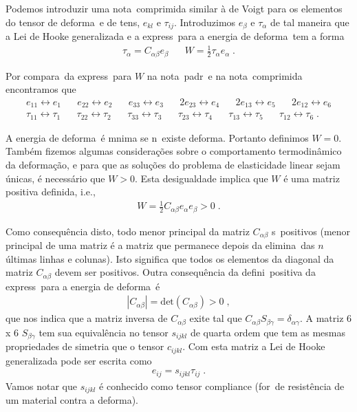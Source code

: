 Podemos introduzir uma nota\cao\ comprimida similar \`a de Voigt para
os elementos do tensor de deforma\cao\ e de tens\ao, 
$e_{kl}$ e $\tau_{ij}$. Introduzimos $e_{\beta}$ e
$\tau_{\alpha}$ de tal maneira que a Lei de Hooke
generalizada e a express\ao\ para a energia de deforma\cao\
tem a forma
\begin{eqnarray}
\tau_{\alpha} = C_{\alpha \beta} e_{\beta} \;\;\;\;\;\;
W = \frac{1}{2}\tau_{\alpha}e_{\alpha} \; .
\end{eqnarray}

Por compara\cao\ da express\ao\ para $W$ na nota\cao\
padr\ao\ e na nota\cao\ comprimida encontramos que
\begin{eqnarray*}
e_{11} \leftrightarrow e_{1} \;\;\;\;\;\;
e_{22} \leftrightarrow e_{2} \;\;\;\;\;\;
e_{33} \leftrightarrow e_{3} \;\;\;\;\;\;
2e_{23} \leftrightarrow e_{4} \;\;\;\;\;\;
2e_{13} \leftrightarrow e_{5} \;\;\;\;\;\;
2e_{12} \leftrightarrow e_{6} \\
\tau_{11} \leftrightarrow \tau_{1} \;\;\;\;\;\;
\tau_{22} \leftrightarrow \tau_{2} \;\;\;\;\;\;
\tau_{33} \leftrightarrow \tau_{3} \;\;\;\;\;\;
\tau_{23} \leftrightarrow \tau_{4} \;\;\;\;\;\;
\tau_{13} \leftrightarrow \tau_{5} \;\;\;\;\;\;
\tau_{12} \leftrightarrow \tau_{6} \; .
\end{eqnarray*}

A energia de deforma\cao\ \'e m\ih nima se n\ao\ existe
deforma\cao. Portanto definimos $W=0$. Tamb\'em fizemos algumas
considera\c{c}\~oes sobre o comportamento termodin\^amico  da deforma\c{c}\~ao,
 e para que as solu\c{c}\~oes do problema de elasticidade
linear sejam \'unicas, \'e necess\'ario que $W>0$. Esta desigualdade
implica que $W$ \'e uma matriz positiva definida, i.e.,
\begin{eqnarray}
W = \frac{1}{2}C_{\alpha \beta}e_{\alpha}e_{\beta}>0 \; .
\end{eqnarray}

Como consequ\^encia disto, todo menor principal da matriz $C_{\alpha
\beta}$ s\ao\ positivos (menor principal de uma matriz \'e a matriz que
permanece depois da elimina\cao\ das $n$ \'ultimas linhas e colunas).
Isto significa que todos os elementos da diagonal da matriz $C_{\alpha
\beta}$ devem ser positivos. Outra consequ\^encia da defini\cao\
positiva da express\ao\ para a energia de deforma\cao\ \'e
\begin{eqnarray}
|C_{\alpha \beta}| = \mbox{det}(C_{\alpha \beta}) > 0 \; ,
\end{eqnarray}
que nos indica que a matriz inversa de $C_{\alpha \beta}$ exite tal que
$C_{\alpha \beta} S_{\beta \gamma} = \delta_{\alpha \gamma}$. A matriz 6
x 6 $S_{\beta \gamma}$ tem sua equival\^encia no tensor $s_{ijkl}$ de
quarta ordem que tem as mesmas propriedades de simetria que o tensor
$c_{ijkl}$. Com esta matriz a Lei de Hooke generalizada pode ser escrita
como
\begin{eqnarray}
e_{ij} = s_{ijkl} \tau_{ij} \; .
\end{eqnarray}
Vamos notar que $s_{ijkl}$ \'e conhecido como tensor compliance
(for\ca\ de resist\^encia de um material contra a deforma\cao).

